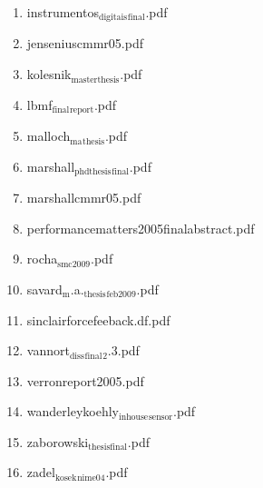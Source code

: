 \documentclass[11pt]{article}
\begin{document}
\begin{enumerate}
\begin{enumerate}
\item instrumentos$_{\text{digitais}}$$_{\text{final}}$.pdf
\label{sec-1-1-1-1-49-2-1-8-17}

\item jenseniuscmmr05.pdf
\label{sec-1-1-1-1-49-2-1-8-18}

\item kolesnik$_{\text{masterthesis}}$.pdf
\label{sec-1-1-1-1-49-2-1-8-19}

\item lbmf$_{\text{final}}$$_{\text{report}}$.pdf
\label{sec-1-1-1-1-49-2-1-8-20}

\item malloch$_{\text{ma}}$$_{\text{thesis}}$.pdf
\label{sec-1-1-1-1-49-2-1-8-21}

\item marshall$_{\text{phdthesis}}$$_{\text{final}}$.pdf
\label{sec-1-1-1-1-49-2-1-8-22}

\item marshallcmmr05.pdf
\label{sec-1-1-1-1-49-2-1-8-23}

\item performancematters2005finalabstract.pdf
\label{sec-1-1-1-1-49-2-1-8-24}

\item rocha$_{\text{smc2009}}$.pdf
\label{sec-1-1-1-1-49-2-1-8-25}

\item savard$_{\text{m}}$.a.$_{\text{thesis}}$$_{\text{feb2009}}$.pdf
\label{sec-1-1-1-1-49-2-1-8-26}

\item sinclairforcefeeback.df.pdf
\label{sec-1-1-1-1-49-2-1-8-27}

\item vannort$_{\text{diss}}$$_{\text{final}}$$_{\text{2}}$.3.pdf
\label{sec-1-1-1-1-49-2-1-8-28}

\item verronreport2005.pdf
\label{sec-1-1-1-1-49-2-1-8-29}

\item wanderleykoehly$_{\text{inhouse}}$$_{\text{sensor}}$.pdf
\label{sec-1-1-1-1-49-2-1-8-30}

\item zaborowski$_{\text{thesisfinal}}$.pdf
\label{sec-1-1-1-1-49-2-1-8-31}

\item zadel$_{\text{kosek}}$$_{\text{nime04}}$.pdf
\label{sec-1-1-1-1-49-2-1-8-32}
\end{enumerate}


\end{enumerate}
\end{document}
